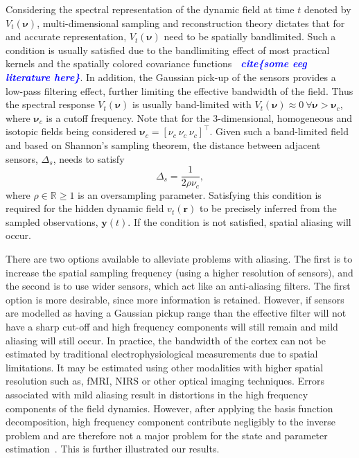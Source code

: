 \documentclass[12pt]{iopart}		%
\newcommand{\todo}[1]{\textsf{\emph{\textbf{\textcolor{blue}{#1}}}}}
\begin{document}
Considering the spectral representation of the dynamic field at time $t$ denoted by $V_t(\boldsymbol{\nu})$, multi-dimensional sampling and reconstruction theory dictates that for and accurate representation, $V_t(\boldsymbol{\nu})$ need to be spatially bandlimited. Such a condition is usually satisfied due to the bandlimiting effect of most practical kernels and the spatially colored covariance functions \todo{~cite\{some eeg literature here\}}. In addition, the Gaussian pick-up of the sensors provides a low-pass filtering effect, further limiting the effective bandwidth of the field. Thus the spectral response $V_t(\boldsymbol{\nu})$ is usually band-limited with $V_t(\boldsymbol{\nu}) \approx 0 ~ \forall \boldsymbol{\nu} > \boldsymbol{\nu}_c$, where $\boldsymbol{\nu}_c$ is a cutoff frequency. Note that for the 3-dimensional, homogeneous and isotopic fields being considered $\boldsymbol{\nu}_c = [\nu_c ~ \nu_c ~ \nu_c]^\top$. Given such a band-limited field and based on Shannon's sampling theorem, the distance between adjacent sensors, $\Delta_s$, needs to satisfy
\begin{equation}
\Delta_s = \frac{1}{2\rho\nu_c},
\end{equation}
where $\rho \in \mathbb{R} \ge 1$ is an oversampling parameter. Satisfying this condition is required for the hidden dynamic field $v_t(\mathbf{r})$ to be precisely inferred from the sampled observations, $\mathbf{y}(t)$. If the condition is not satisfied, spatial aliasing will occur.

There are two options available to alleviate problems with aliasing. The first is to increase the spatial sampling frequency (using a higher resolution of sensors), and the second is to use wider sensors, which act like an anti-aliasing filters. The first option is more desirable, since more information is retained. However, if sensors are modelled as having a Gaussian pickup range than the effective filter will not have a sharp cut-off and high frequency components will still remain and mild aliasing will still occur. In practice, the bandwidth of the cortex can not be estimated by traditional electrophysiological measurements due to spatial limitations. It may be estimated using other modalities with higher spatial resolution such as, fMRI, NIRS or other optical imaging techniques. Errors associated with mild aliasing result in distortions in the high frequency components of the field dynamics. However, after applying the basis function decomposition, high frequency component contribute negligibly to the inverse problem and are therefore not a major problem for the state and parameter estimation~\cite{Sanner1992}. This is further illustrated our results.
\end{document}
